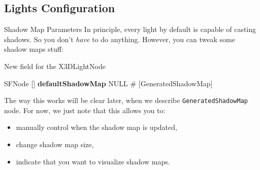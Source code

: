 \documentclass{beamer}
\newcommand*{\codeem}[1]{\textbf{#1}}
\begin{document}
\subsection{Lights Configuration}

\begin{frame}[fragile]{Shadow Map Parameters}
  In principle, every light by default is capable of casting shadows.
  So you don't \emph{have} to do anything.
  However, you can tweak some shadow maps stuff:

\begin{block}{New field for the X3DLightNode}
\begin{semiverbatim}
SFNode  []  \codeem{defaultShadowMap}  NULL
  \# [GeneratedShadowMap]
\end{semiverbatim}
\end{block}

  The way this works will be clear later, when we describe
  \texttt{GeneratedShadowMap} node. For now, we just note that
  this allows you to:

  \begin{itemize}
    \item manually control when the shadow map is updated,
    \item change shadow map size,
    \item indicate that you want to visualize shadow maps.
  \end{itemize}
\end{frame}
\end{document}
